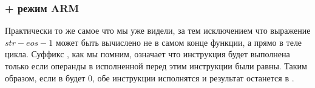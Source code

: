
\subsubsection{\OptimizingKeil{} + режим ARM}



Практически то же самое что мы уже видели, за тем исключением что выражение $str - eos - 1$ может быть вычислено
не в самом конце функции, а прямо в теле цикла. Суффикс , как мы помним, означает что инструкция будет выполнена только
если операнды в исполненной перед этим инструкции \CMP были равны. 
Таким образом, если в  будет 0, обе инструкции  исполнятся и результат останется в .

